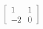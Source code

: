 \documentclass[preview]{standalone}
\begin{document}
\begin{center}
$\begin{bmatrix} 1 & 1 \\ -2 & 0 \end{bmatrix}$
\end{center}
\end{document}
